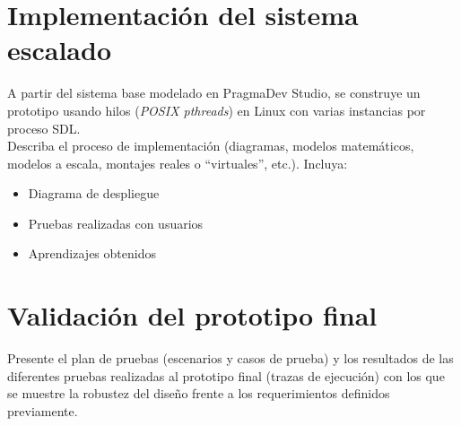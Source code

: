
\section{Implementación del sistema escalado}

A partir del sistema base modelado en PragmaDev Studio, se construye un prototipo usando hilos (\textit{POSIX pthreads}) en Linux con varias instancias por proceso SDL.\\

Describa el proceso de implementación (diagramas, modelos matemáticos, modelos a escala, montajes reales o “virtuales”, etc.). Incluya:

\begin{itemize}
    \item Diagrama de despliegue
    \item Pruebas realizadas con usuarios
    \item Aprendizajes obtenidos
\end{itemize}

\section{Validación del prototipo final}

Presente el plan de pruebas (escenarios y casos de prueba) y los resultados de las diferentes pruebas realizadas al prototipo final (trazas de ejecución) con los que se muestre la robustez del diseño frente a los requerimientos definidos previamente.
